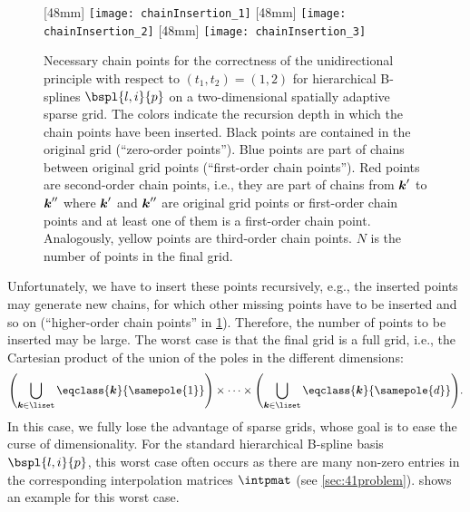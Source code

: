 \begin{figure}
  [48mm]{%
    \texttt{[image: chainInsertion\_1]}%
  }%
  \hfill%
  [48mm]{%
    \texttt{[image: chainInsertion\_2]}%
  }%
  \hfill%
  [48mm]{%
    \texttt{[image: chainInsertion\_3]}%
  }%
  \caption[%
    Chain points for hierarchical B-splines on a sparse grid%
  ]{%
    Necessary chain points for the correctness of the unidirectional principle
    with respect to $(t_1, t_2) = (1, 2)$
    for hierarchical B-splines $\bspl{l,i}{p}$ on a
    two-dimensional spatially adaptive sparse grid.
    The colors indicate the recursion depth in which the
    chain points have been inserted.
    Black points are contained in the original grid
    (``zero-order points'').
    \textcolor{C0}{Blue points} are part of chains
    between original grid points (``first-order chain points'').
    \textcolor{C1}{Red points} are second-order chain points,
    i.e., they are part of chains
    from ${\boldsymbol{k}}'$ to ${\boldsymbol{k}}''$ where ${\boldsymbol{k}}'$ and ${\boldsymbol{k}}''$ are
    original grid points or first-order chain points
    and at least one of them is a first-order chain point.
    Analogously,
    \textcolor{C2}{yellow points} are third-order chain points.
    $N$ is the number of points in the final grid.%
  }%
  \label{fig:chainInsertionBSpline}%
\end{figure}

Unfortunately, we have to insert these points recursively,
e.g., the inserted points may generate new chains,
for which other missing points have to be inserted and so on
(``higher-order chain points'' in \cref{fig:chainInsertionBSpline}).
Therefore, the number of points to be inserted may be large.
The worst case is that the final grid is a full grid, i.e.,
the Cartesian product of the union of the poles in the different dimensions:
\begin{equation}
  \paren*{\bigcup_{\*k \in \liset} \eqclass{\*k}{\samepole{1}}}
  \times \dotsb \times
  \paren*{\bigcup_{\*k \in \liset} \eqclass{\*k}{\samepole{d}}}.
\end{equation}
In this case, we fully lose the advantage of sparse grids,
whose goal is to ease the curse of dimensionality.
For the standard hierarchical B-spline basis $\bspl{l,i}{p}$,
this worst case often occurs as there are many non-zero entries
in the corresponding interpolation matrices $\intpmat$
(see \cref{sec:41problem}).
 shows an example for this worst case.



